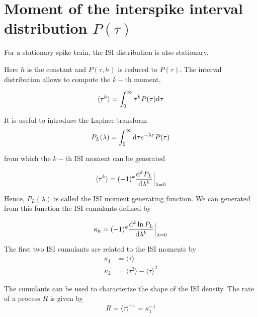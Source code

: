 \documentclass[12pt,twoside]{report}
\def \dd  {{\rm d}}
\begin{document}
\section{Moment of the interspike interval distribution $P(\tau)$}

For a stationary spike train, the ISI distribution is also stationary.

Here  $h$ is the constant and $P(\tau,h)$ is reduced to $P(\tau)$. The interval distribution allows to compute the $k-$th moment,

\begin{equation}
\label{eq:Pmoment}
\langle\tau^k\rangle=\int_0^\infty \tau^kP(\tau)\dd\tau
\end{equation}

It is useful to introduce the Laplace transform
\begin{equation}
\label{eq:Plaplace}
P_L(\lambda)=\int_0^\infty\dd\tau e^{-\lambda \tau}P(\tau)
\end{equation}

from which the  $k-$th ISI moment can be generated

\begin{equation}
\label{eq:Pmoment2}
\langle\tau^k\rangle=(-1)^k\frac{\dd^k P_L}{\dd \lambda^k}\Bigr|_{\lambda=0}
\end{equation}

Hence, $P_L(\lambda)$ is called the ISI moment generating function. We can generated from this function the ISI cumulants defined by

\begin{equation}
\label{eq:Pcumulant}
\kappa_k=(-1)^k\frac{\dd^k \ln P_L}{\dd \lambda^k}\Bigr|_{\lambda=0}
\end{equation}

The first two ISI cumulants are related to the ISI moments by
\begin{align}
\label{eq:kappa1234}
\kappa_1&=\langle\tau\rangle\\
\kappa_2&=\langle\tau^2\rangle-\langle\tau\rangle^2
\end{align}


The cumulants can be used to characterize the shape of the ISI density. The rate of a process $R$ is given by
\begin{equation}
\label{eq:R}
R=\langle\tau\rangle^{-1}=\kappa_1^{-1}
\end{equation}
\end{document}
